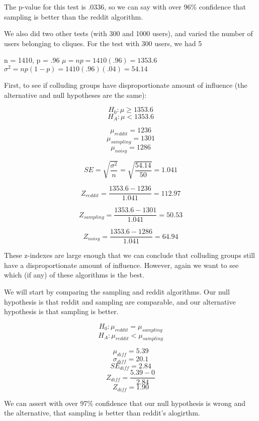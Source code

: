 \documentclass[12pt, oneside]{amsart}
\begin{document}
The p-value for this test is .0336, so we can say with over 96\% confidence that sampling is better than the reddit algorithm.

\vspace{.4cm}

We also did two other tests (with 300 and 1000 users), and varied the number of users belonging to cliques.  For the test with 300 users, we had 5%

\begin{center}
n = 1410, p = .96
$\mu = np = 1410 (.96) = 1353.6$ \\
$\sigma^2 = np(1 - p) = 1410 (.96)(.04) = 54.14$ \\
\end{center}

First, to see if colluding groups have disproportionate amount of influence (the alternative and null hypotheses are the same):

$$H_0: \mu \geq 1353.6$$
$$H_A: \mu < 1353.6$$

$$\mu_{reddit} = 1236$$
$$\mu_{sampling} = 1301$$
$$\mu_{noisy} = 1286$$

$$SE = \sqrt{\frac{\sigma^2}{n}} = \sqrt{\frac{54.14}{50}} = 1.041$$

$$Z_{reddit} = \frac{1353.6 - 1236}{1.041} = 112.97$$

$$Z_{sampling} = \frac{1353.6 - 1301}{1.041} = 50.53$$

$$Z_{noisy} = \frac{1353.6 - 1286}{1.041} = 64.94$$

These z-indexes are large enough that we can conclude that colluding groups still have a disproportionate amount of influence.  However, again we want to see which (if any) of these algorithms is the best.

We will start by comparing the sampling and reddit algorithms.  Our null hypothesis is that reddit and sampling are comparable, and our alternative hypothesis is that sampling is better.

$$H_0: \mu_{reddit} = \mu_{sampling}$$
$$H_A: \mu_{reddit} < \mu_{sampling}$$

$$\mu_{diff} = 5.39$$
$$\sigma_{diff} = 20.1$$
$$SE_{diff} = 2.84$$
$$Z_{diff} = \frac{5.39 - 0}{2.84}$$
$$Z_{diff} = 1.90$$

We can assert with over 97\% confidence that our null hypothesis is wrong and the alternative, that sampling is better than reddit's alogirthm.
\end{document}
